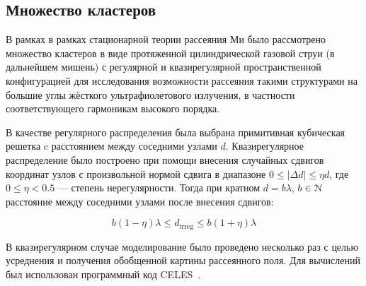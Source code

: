 \subsection{Множество кластеров}

В рамках в рамках стационарной теории рассеяния Ми было рассмотрено множество кластеров в виде протяженной цилиндрической газовой струи (в дальнейшем мишень) с регулярной и квазирегулярной пространственной конфигурацией для исследования возможности рассеяния такими структурами на большие углы жёсткого ультрафиолетового излучения, в частности соответствующего гармоникам высокого порядка.

В качестве регулярного распределения была выбрана примитивная кубическая решетка c расстоянием между соседними узлами $d$. Квазирегулярное распределение было построено при помощи внесения случайных сдвигов координат узлов с произвольной нормой сдвига в диапазоне $0 \leq |\Delta d| \leq \eta d$, где $0 \leq \eta < 0.5$ --- степень нерегулярности. Тогда при кратном $d = b\lambda$, $b \in \EuScript{N}$ расстояние между соседними узлами после внесения сдвигов:

    \begin{equation}
        b\left(1 - \eta\right)\lambda \le d_{\textrm{irreg}} \le b\left(1 + \eta\right)\lambda
    \end{equation}

В квазирегулярном случае моделирование было проведено несколько раз с целью усреднения и получения обобщенной картины рассеянного поля. Для вычислений был использован программный код CELES~\cite{celes}.





